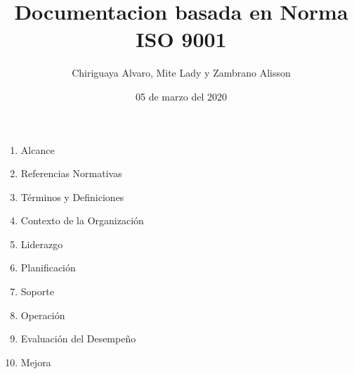 \documentclass[11pt,a4paper]{article}
\author{Chiriguaya Alvaro, Mite Lady y Zambrano Alisson}
\title{Documentacion basada en Norma ISO 9001}
\date{05 de marzo del 2020}
\begin{document}
\maketitle
\begin{enumerate}
    \item Alcance
    \item Referencias Normativas
    \item T\'erminos y Definiciones
	\item Contexto de la Organización   
    \item Liderazgo
    \item Planificación
    \item Soporte
	\item Operación
	\item Evaluación del Desempeño
	\item Mejora
\end{enumerate}
\end{document}
